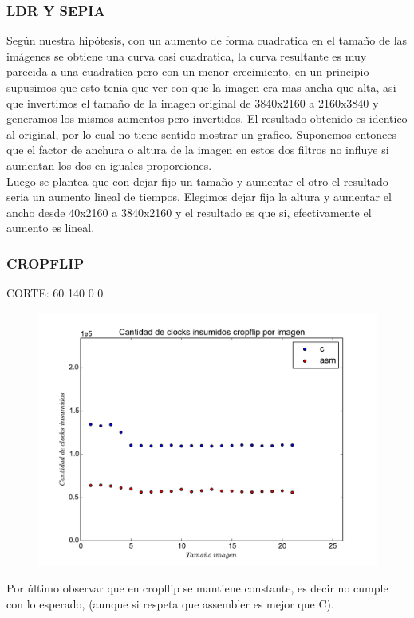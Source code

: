 \subsubsection*{LDR Y SEPIA}  
Según nuestra hipótesis, con un aumento de forma cuadratica en el tamaño de las imágenes se obtiene una curva casi cuadratica, la curva resultante es muy parecida a una cuadratica pero con un menor crecimiento, en un principio supusimos que esto tenia que ver con que la imagen era mas ancha que alta, asi que invertimos el tamaño de la imagen original de 3840x2160 a 2160x3840 y generamos los mismos aumentos pero invertidos. El resultado obtenido es identico al original, por lo cual no tiene sentido mostrar un grafico. Suponemos entonces que el factor de anchura o altura de la imagen en estos dos filtros no influye si aumentan los dos en iguales proporciones. \\

Luego se plantea que con dejar fijo un tamaño y aumentar el otro el resultado seria un aumento lineal de tiempos. Elegimos dejar fija la altura y aumentar el ancho desde 40x2160 a 3840x2160 y el resultado es que si, efectivamente el aumento es lineal. \\

\subsubsection*{CROPFLIP}

CORTE: 60 140 0 0 

\begin{figure}
  \begin{center}
	\includegraphics[scale=0.5]{cropflipall.pdf}
  \end{center}
\end{figure}


Por último observar que en cropflip se mantiene constante, es decir no cumple con lo esperado, (aunque si respeta que assembler es mejor que C). \\
\newpage